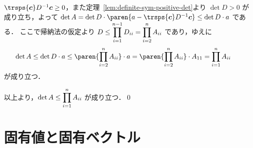\documentclass[a4paper]{jsarticle}
\begin{document}
{\begin{itemize}
        $\trsps{\vecc} D^{-1} \vecc \geq 0$，また定理~\ref{lem:definite-sym-positive-det}より $\det D > 0$ が成り立ち，よって
        $\det A = \det D \cdot \paren{a - \trsps{\vecc} D^{-1} \vecc} \leq \det D \cdot a$ である．
        ここで帰納法の仮定より $\displaystyle D \leq \prod_{i = 1}^{n - 1} D_{i i} = \prod_{i = 2}^{n} A_{i i}$ であり，ゆえに
        \begin{align*}
          \det A
          \leq \det D \cdot a
          \leq \paren{\prod_{i = 2}^{n} A_{i i}} \cdot a
          &= \paren{\prod_{i = 2}^{n} A_{i i}} \cdot A_{1 1}
          = \prod_{i = 1}^{n} A_{i i}
        \end{align*}
        が成り立つ．
      \end{itemize}
      以上より，$\displaystyle \det A \leq \prod_{i = 1}^{n} A_{i i}$ が成り立つ．\qed
    }
\section{固有値と固有ベクトル}
\end{document}
